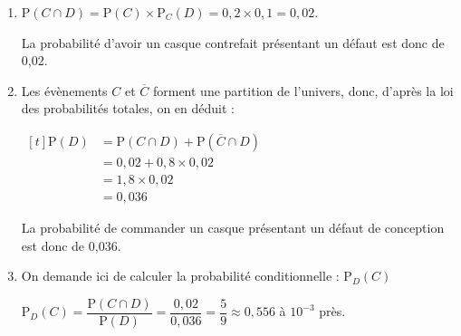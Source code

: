 \begin{enumerate}
\item 	$\mathrm{P}(C\cap D) = \mathrm{P}(C) \times \mathrm{P}_C(D) = 0,2 \times 0,1 = 0,02$.

La probabilité d'avoir un casque contrefait présentant un défaut est donc de 0,02.

\item Les évènements $C$ et $\overline{C}$ forment une partition de l'univers, donc, d'après la loi des probabilités totales, on en déduit :

$\begin{aligned}[t] \mathrm{P}(D) &= \mathrm{P}(C \cap D) + \mathrm{P}\left(\overline{C} \cap D\right)\\
&= 0,02 + 0,8 \times 0,02\\
&= 1,8 \times 0,02\\
&= 0,036\end{aligned}$

La probabilité de commander un casque présentant un défaut de conception est donc de 0,036.
\item On demande ici de calculer la probabilité conditionnelle : $\mathrm{P}_D(C)$

$\mathrm{P}_D(C) = \dfrac{\mathrm{P}(C \cap D)}{\mathrm{P}(D)} = \dfrac{0,02}{0,036} = \dfrac{5}{9} \approx 0,556$ à $10^{-3}$ près.
\end{enumerate}

\medskip

